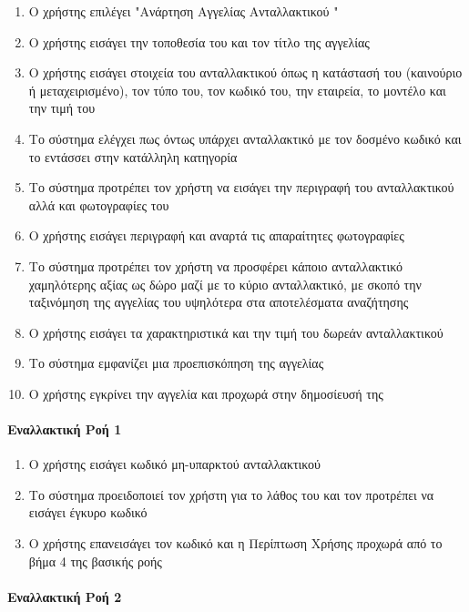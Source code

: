 \documentclass{../ol-softwaremanual}
\begin{document}
	\begin{enumerate}
		\item Ο χρήστης επιλέγει \en"\gr Ανάρτηση Αγγελίας Ανταλλακτικού \en"\gr
		\item Ο χρήστης εισάγει την τοποθεσία του και τον τίτλο της αγγελίας		
		\item Ο χρήστης εισάγει στοιχεία του ανταλλακτικού όπως η κατάστασή του (καινούριο ή μεταχειρισμένο), τον τύπο του, τον κωδικό του, την εταιρεία, το μοντέλο και την τιμή του
		\item Το σύστημα ελέγχει πως όντως υπάρχει ανταλλακτικό με τον δοσμένο κωδικό και το εντάσσει στην κατάλληλη κατηγορία
		\item Το σύστημα προτρέπει τον χρήστη να εισάγει την περιγραφή του ανταλλακτικού αλλά και φωτογραφίες του
		\item Ο χρήστης εισάγει περιγραφή και αναρτά τις απαραίτητες φωτογραφίες
		\item Το σύστημα προτρέπει τον χρήστη να προσφέρει κάποιο ανταλλακτικό χαμηλότερης αξίας ως δώρο μαζί με το κύριο ανταλλακτικό, με σκοπό την ταξινόμηση της αγγελίας του υψηλότερα στα αποτελέσματα αναζήτησης
		\item Ο χρήστης εισάγει τα χαρακτηριστικά και την τιμή του δωρεάν ανταλλακτικού
		\item Το σύστημα εμφανίζει μια προεπισκόπηση της αγγελίας
		\item Ο χρήστης εγκρίνει την αγγελία και προχωρά στην δημοσίευσή της
	\end{enumerate}

	\paragraph{Εναλλακτική Ροή 1}
	
	\begin{enumerate}
		\item Ο χρήστης εισάγει κωδικό μη-υπαρκτού ανταλλακτικού
		\item Το σύστημα προειδοποιεί τον χρήστη για το λάθος του και τον προτρέπει να εισάγει έγκυρο κωδικό
		\item Ο χρήστης επανεισάγει τον κωδικό και η Περίπτωση Χρήσης προχωρά από το βήμα 4 της βασικής ροής
	\end{enumerate}

	\paragraph{Εναλλακτική Ροή 2}
	
\end{document}
